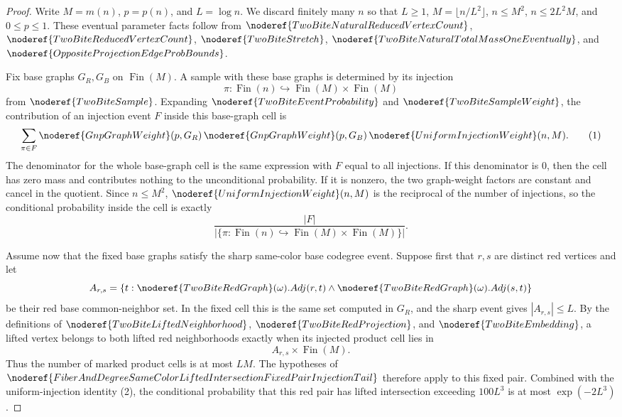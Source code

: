 \begin{proof}
Write \(M=m(n)\), \(p=p(n)\), and \(L=\log n\).  We discard finitely many
\(n\) so that \(L\ge1\), \(M=\lfloor n/L^2\rfloor\), \(n\le M^2\),
\(n\le 2L^2M\), and \(0\le p\le1\).  These eventual parameter facts follow
from \(\noderef{TwoBiteNaturalReducedVertexCount}\),
\(\noderef{TwoBiteReducedVertexCount}\), \(\noderef{TwoBiteStretch}\),
\(\noderef{TwoBiteNaturalTotalMassOneEventually}\), and
\(\noderef{OppositeProjectionEdgeProbBounds}\).

Fix base graphs \(G_R,G_B\) on \(\operatorname{Fin}(M)\).  A sample with
these base graphs is determined by its injection
\[
\pi:\operatorname{Fin}(n)\hookrightarrow
\operatorname{Fin}(M)\times\operatorname{Fin}(M)
\]
from \(\noderef{TwoBiteSample}\).  Expanding
\(\noderef{TwoBiteEventProbability}\) and
\(\noderef{TwoBiteSampleWeight}\), the contribution of an injection event
\(F\) inside this base-graph cell is
\[
\sum_{\pi\in F}
\noderef{GnpGraphWeight}(p,G_R)\,
\noderef{GnpGraphWeight}(p,G_B)\,
\noderef{UniformInjectionWeight}(n,M).
\tag{1}
\]
The denominator for the whole base-graph cell is the same expression with
\(F\) equal to all injections.  If this denominator is \(0\), then the cell
has zero mass and contributes nothing to the unconditional probability.  If it
is nonzero, the two graph-weight factors are constant and cancel in the
quotient.  Since \(n\le M^2\), \(\noderef{UniformInjectionWeight}(n,M)\) is
the reciprocal of the number of injections, so the conditional probability
inside the cell is exactly
\[
\frac{|F|}
{|\{\pi:\operatorname{Fin}(n)\hookrightarrow
\operatorname{Fin}(M)\times\operatorname{Fin}(M)\}|}.
\tag{2}
\]

Assume now that the fixed base graphs satisfy the sharp same-color base
codegree event.  Suppose first that \(r,s\) are distinct red vertices and let
\[
A_{r,s}=\{t:\noderef{TwoBiteRedGraph}(\omega).Adj(r,t)\land
\noderef{TwoBiteRedGraph}(\omega).Adj(s,t)\}
\]
be their red base common-neighbor set.  In the fixed cell this is the same set
computed in \(G_R\), and the sharp event gives \(|A_{r,s}|\le L\).  By the
definitions of
\(\noderef{TwoBiteLiftedNeighborhood}\), \(\noderef{TwoBiteRedProjection}\),
and \(\noderef{TwoBiteEmbedding}\), a lifted vertex belongs to both lifted
red neighborhoods exactly when its injected product cell lies in
\[
A_{r,s}\times \operatorname{Fin}(M).
\]
Thus the number of marked product cells is at most \(LM\).  The hypotheses
of \(\noderef{FiberAndDegreeSameColorLiftedIntersectionFixedPairInjectionTail}\)
therefore apply to this fixed pair.  Combined with the uniform-injection
identity (2), the conditional probability that this red pair has lifted
intersection exceeding \(100L^3\) is at most \(\exp(-2L^3)\).


\end{proof}
